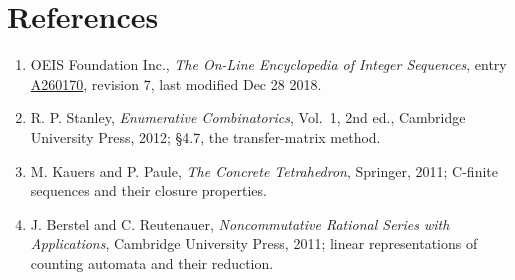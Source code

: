 \documentclass[11pt]{article}
\theoremstyle{definition}
\begin{document}
\section{References}

\begin{enumerate}

\item OEIS Foundation Inc., \emph{The On-Line Encyclopedia of Integer Sequences}, entry \href{https://oeis.org/A260170}{A260170}, revision 7, last modified Dec 28 2018.

\item R. P. Stanley, \emph{Enumerative Combinatorics}, Vol.~1, 2nd ed., Cambridge University Press, 2012; \S4.7, the transfer-matrix method.

\item M. Kauers and P. Paule, \emph{The Concrete Tetrahedron}, Springer, 2011; C-finite sequences and their closure properties.

\item J. Berstel and C. Reutenauer, \emph{Noncommutative Rational Series with Applications}, Cambridge University Press, 2011; linear representations of counting automata and their reduction.

\end{enumerate}
\end{document}
